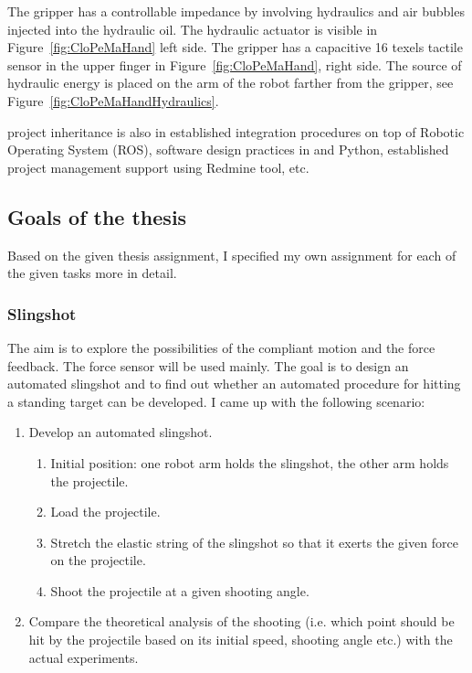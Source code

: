         The gripper has a controllable impedance by involving hydraulics and air bubbles injected into the hydraulic oil. The hydraulic actuator is visible in Figure~\ref{fig:CloPeMaHand} left side. The gripper has a capacitive 16 texels tactile sensor in the upper finger in Figure~\ref{fig:CloPeMaHand}, right side. The source of hydraulic energy is placed on the arm of the robot farther from the gripper, see Figure~\ref{fig:CloPeMaHandHydraulics}.

        \CloPeMa\/ project inheritance is also in established integration procedures on top of Robotic Operating System (ROS), software design practices in  \Cplusplus\/ and Python, established project management support using Redmine tool, etc.

    \subsection{Goals of the thesis}
    Based on the given thesis assignment, I specified my own assignment for each of the given tasks more in detail.

        \subsubsection{Slingshot}
        The aim is to explore the possibilities of the compliant motion and the force feedback. The force sensor will be used mainly. The goal is to design an automated slingshot and to find out whether an automated procedure for hitting a standing target can be developed. I came up with the following scenario:
            \begin{enumerate}
                \item Develop an automated slingshot.
%
                \begin{enumerate}
                    \item Initial position: one robot arm holds the slingshot, the other arm holds the projectile.
                    \item Load the projectile.
                    \item Stretch the elastic string of the slingshot so that it exerts the given force on the projectile.
                    \item Shoot the projectile at a given shooting angle.
                \end{enumerate}
%
                \item Compare the theoretical analysis of the shooting (i.e. which point should be hit by the projectile based on its initial speed, shooting angle etc.) with the actual experiments.
            \end{enumerate}


